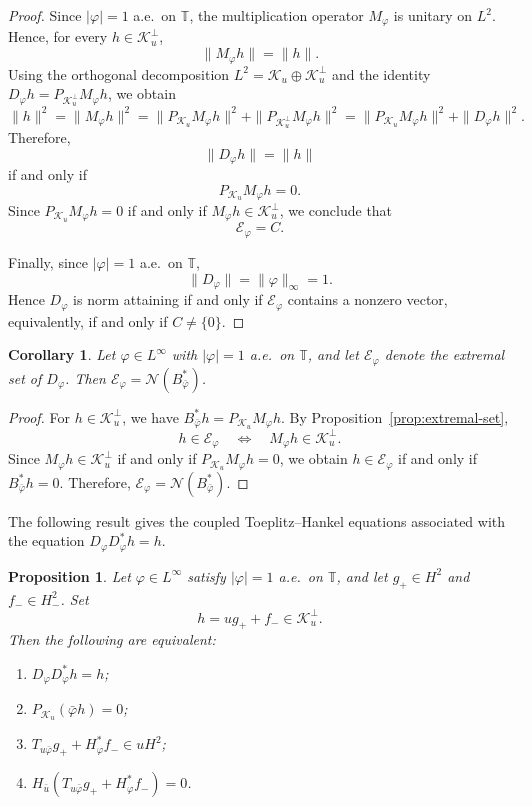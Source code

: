 \documentclass[12pt]{amsart}
\newtheorem{corollary}[theorem]{Corollary}
\newtheorem{proposition}[theorem]{Proposition}
\theoremstyle{definition}
\theoremstyle{remark}
\def \T{\mathbb{T}}
\newcommand{\cle}{\mathcal{E}}
\newcommand{\cln}{\mathcal{N}}
\newcommand{\clk}{\mathcal{K}}
\newcommand{\vp}{\varphi}
\numberwithin{equation}{section}
\begin{document}
\begin{proof}
Since $|\vp|=1$ a.e.\ on $\T$, the multiplication operator
$M_\vp$ is unitary on $L^2$. Hence, for every $h\in\clk_u^\perp$,
\[
\|M_\vp h\|=\|h\|.
\]
Using the orthogonal decomposition $L^2=\clk_u\oplus\clk_u^\perp$
and the identity $D_\vp h=P_{\clk_u^\perp}M_\vp h$,
we obtain
\[
\|h\|^2=\|M_\vp h\|^2=\|P_{\clk_u}M_\vp h\|^2+\|P_{\clk_u^\perp}M_\vp h\|^2=\|P_{\clk_u}M_\vp h\|^2+\|D_\vp h\|^2.
\]
Therefore,
\[
\|D_\vp h\|=\|h\|
\]
if and only if
\[
P_{\clk_u}M_\vp h=0.
\]
Since $P_{\clk_u}M_\vp h=0$ if and only if $M_\vp h\in\clk_u^\perp$,
we conclude that
\[
\cle_\vp=C.
\]
	
Finally, since $|\vp|=1$ a.e.\ on $\T$,
\[
\|D_\vp\|=\|\vp\|_\infty=1.
\]
Hence $D_\vp$ is norm attaining if and only if $\cle_\vp$ contains a nonzero vector, equivalently, if and only if $C\neq\{0\}$.
\end{proof}




\begin{corollary}
Let $\vp\in L^\infty$ with $|\vp|=1$ a.e.\ on $\T$, and let
$\cle_\vp$ denote the extremal set of $D_\vp$. Then $\cle_\vp=\cln(B^*_{\bar{\vp}})$.
\end{corollary}

\begin{proof}
For $h\in\clk_u^\perp$, we have $B^*_{\bar{\vp}}h=P_{\clk_u}M_\vp h$.
By Proposition~\ref{prop:extremal-set},
\[
h\in\cle_\vp
\quad\Longleftrightarrow\quad
M_\vp h\in\clk_u^\perp.
\]
Since $M_\vp h\in\clk_u^\perp$ if and only if $P_{\clk_u}M_\vp h=0$,
we obtain $h\in\cle_\vp$ if and only if $B^*_{\bar{\vp}}h=0$. Therefore, $\cle_\vp=\cln(B^*_{\bar{\vp}})$.
\end{proof}




The following result gives the coupled Toeplitz--Hankel equations
associated with the equation $D_\vp D_\vp^*h=h$.


\begin{proposition}\label{prop:coupled-TH}
Let $\vp\in L^\infty$ satisfy $|\vp|=1$ a.e.\ on $\T$, and let $g_{+}\in H^2$ and $f_{-}\in H^2_{-}$. Set
\[
h=ug_{+}+f_{-}\in\clk_u^\perp.
\]
Then the following are equivalent:
\begin{enumerate}
\item $D_\vp D_\vp^*h=h$;
		
\item $P_{\clk_u}(\bar{\vp} h)=0$;
		
\item $T_{u\bar{\vp}}g_{+} + H_\vp^*f_{-}\in uH^2$;

\item $H_{\bar u}\left(T_{u\bar{\vp}}g_{+} + H_\vp^*f_{-}\right)=0$.
\end{enumerate}
\end{proposition}
\end{document}
